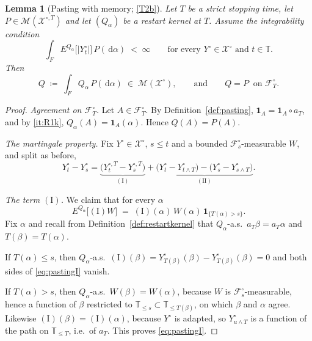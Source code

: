 \documentclass[11pt,a4paper]{article}
\theoremstyle{plain}
\newtheorem{lemma}[theorem]{Lemma}
\theoremstyle{definition}
\theoremstyle{remark}
\newcommand{\T}{\mathbb{T}}                     %
\newcommand{\Filt}{\mathcal{F}}
\newcommand{\XX}{\mathcal{X}}                  %
\newcommand{\Msol}{\mathcal{M}}
\newcommand{\one}{\mathbf{1}}
\newcommand{\dif}{\,\mathrm{d}}
\begin{document}
\begin{lemma}[Pasting with memory; \eqref{T2b}]
  \label{lem:pasting}
  Let $T$ be a strict stopping time, let $P \in \Msol(\XX^{\circ,T})$ and let
  $(Q_\alpha)$ be a restart kernel at $T$.  Assume the integrability condition
  \[
    \int_F E^{Q_\alpha}\bigl[ \lvert Y^\circ_t \rvert \bigr] \, P(\dif\alpha)
      \;<\; \infty
    \qquad\text{for every } Y^\circ \in \XX^\circ \text{ and } t \in \T .
  \]
  Then
  \[
    Q \;\coloneqq\; \int_F Q_\alpha \, P(\dif\alpha) \;\in\; \Msol(\XX^\circ) ,
    \qquad\text{and}\qquad Q = P \ \text{ on } \Filt^\circ_T .
  \]
\end{lemma}

\begin{proof}
  \emph{Agreement on $\Filt^\circ_T$.}  Let $A \in \Filt^\circ_T$.  By
  Definition~\ref{def:pasting}, $\one_A = \one_A \circ a_T$, and by \ref{it:R1k},
  $Q_\alpha(A) = \one_A(\alpha)$.  Hence $Q(A) = P(A)$.

  \emph{The martingale property.}  Fix $Y^\circ \in \XX^\circ$, $s \leq t$ and a
  bounded $\Filt^\circ_s$-measurable $W$, and split as before,
  \[
    Y^\circ_t - Y^\circ_s
      = \underbrace{\bigl( Y^{\circ,T}_t - Y^{\circ,T}_s \bigr)}_{(\mathrm{I})}
      + \underbrace{\bigl( Y^\circ_t - Y^\circ_{t \wedge T} \bigr)
                    - \bigl( Y^\circ_s - Y^\circ_{s \wedge T} \bigr)}_{(\mathrm{II})} .
  \]

  \emph{The term $(\mathrm{I})$.}  We claim that for every $\alpha$
  \begin{equation}
    \label{eq:pastingI}
    E^{Q_\alpha}\bigl[ (\mathrm{I}) W \bigr]
      \;=\; (\mathrm{I})(\alpha) \, W(\alpha) \, \one_{\{T(\alpha) > s\}} .
  \end{equation}
  Fix $\alpha$ and recall from Definition~\ref{def:restartkernel} that
  $Q_\alpha$-a.s.\ $a_T\beta = a_T\alpha$ and $T(\beta) = T(\alpha)$.

  If $T(\alpha) \leq s$, then $Q_\alpha$-a.s.\
  $(\mathrm{I})(\beta) = Y^\circ_{T(\beta)}(\beta) - Y^\circ_{T(\beta)}(\beta) = 0$
  and both sides of \eqref{eq:pastingI} vanish.

  If $T(\alpha) > s$, then $Q_\alpha$-a.s.\ $W(\beta) = W(\alpha)$, because $W$ is
  $\Filt^\circ_s$-measurable, hence a function of $\beta$ restricted to
  $\T_{\leq s} \subset \T_{\leq T(\beta)}$, on which $\beta$ and $\alpha$ agree.
  Likewise $(\mathrm{I})(\beta) = (\mathrm{I})(\alpha)$, because $Y^\circ$ is
  adapted, so $Y^\circ_{u \wedge T}$ is a function of the path on
  $\T_{\leq T}$, i.e.\ of $a_T$.  This proves \eqref{eq:pastingI}.


\end{proof}
\end{document}
